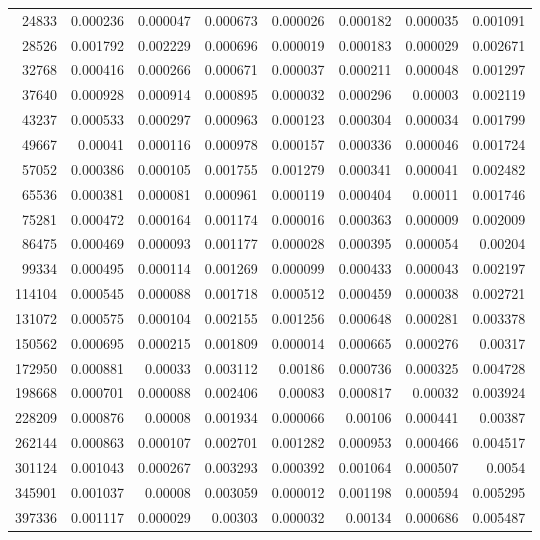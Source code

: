 \begin{tabular}{r r r r r r r r}
24833 & 0.000236 & 0.000047 & 0.000673 & 0.000026 & 0.000182 & 0.000035 & 0.001091 \\
28526 & 0.001792 & 0.002229 & 0.000696 & 0.000019 & 0.000183 & 0.000029 & 0.002671 \\
32768 & 0.000416 & 0.000266 & 0.000671 & 0.000037 & 0.000211 & 0.000048 & 0.001297 \\
37640 & 0.000928 & 0.000914 & 0.000895 & 0.000032 & 0.000296 & 0.00003 & 0.002119 \\
43237 & 0.000533 & 0.000297 & 0.000963 & 0.000123 & 0.000304 & 0.000034 & 0.001799 \\
49667 & 0.00041 & 0.000116 & 0.000978 & 0.000157 & 0.000336 & 0.000046 & 0.001724 \\
57052 & 0.000386 & 0.000105 & 0.001755 & 0.001279 & 0.000341 & 0.000041 & 0.002482 \\
65536 & 0.000381 & 0.000081 & 0.000961 & 0.000119 & 0.000404 & 0.00011 & 0.001746 \\
75281 & 0.000472 & 0.000164 & 0.001174 & 0.000016 & 0.000363 & 0.000009 & 0.002009 \\
86475 & 0.000469 & 0.000093 & 0.001177 & 0.000028 & 0.000395 & 0.000054 & 0.00204 \\
99334 & 0.000495 & 0.000114 & 0.001269 & 0.000099 & 0.000433 & 0.000043 & 0.002197 \\
114104 & 0.000545 & 0.000088 & 0.001718 & 0.000512 & 0.000459 & 0.000038 & 0.002721 \\
131072 & 0.000575 & 0.000104 & 0.002155 & 0.001256 & 0.000648 & 0.000281 & 0.003378 \\
150562 & 0.000695 & 0.000215 & 0.001809 & 0.000014 & 0.000665 & 0.000276 & 0.00317 \\
172950 & 0.000881 & 0.00033 & 0.003112 & 0.00186 & 0.000736 & 0.000325 & 0.004728 \\
198668 & 0.000701 & 0.000088 & 0.002406 & 0.00083 & 0.000817 & 0.00032 & 0.003924 \\
228209 & 0.000876 & 0.00008 & 0.001934 & 0.000066 & 0.00106 & 0.000441 & 0.00387 \\
262144 & 0.000863 & 0.000107 & 0.002701 & 0.001282 & 0.000953 & 0.000466 & 0.004517 \\
301124 & 0.001043 & 0.000267 & 0.003293 & 0.000392 & 0.001064 & 0.000507 & 0.0054 \\
345901 & 0.001037 & 0.00008 & 0.003059 & 0.000012 & 0.001198 & 0.000594 & 0.005295 \\
397336 & 0.001117 & 0.000029 & 0.00303 & 0.000032 & 0.00134 & 0.000686 & 0.005487 \\

\end{tabular}
